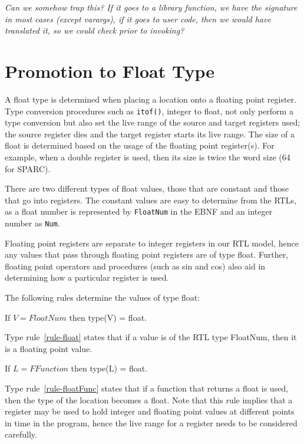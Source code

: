 \emph{Can we somehow trap this?  If it goes to a library function,
we have the signature in most cases (except varargs), if it goes 
to user code, then we would have translated it, so we could check 
prior to invoking?}
 

\section{Promotion to Float Type}
A float type is determined when placing a location onto a 
floating point register.  Type conversion procedures such as 
\texttt{itof()}, integer to float, not only perform a type 
conversion but also set the live range of the source and 
target registers used; the source register dies and the target
register starts its live range.  The size of a float is determined
based on the usage of the floating point register(s).  For 
example, when a double register is used, then its size is twice 
the word size (64 for SPARC). 

There are two different types of float values, those that are 
constant and those that go into registers.  The constant values
are easy to determine from the RTLs, as a float number is 
represented by \texttt{FloatNum} in the EBNF and an integer 
number as \texttt{Num}.  

Floating point registers are separate to integer registers in our
RTL model, hence any values that pass through floating point 
registers are of type float.  Further, floating point operators 
and procedures (such as sin and cos) also aid in determining how a 
particular register is used.  

The following rules determine the values of type float: 

\begin{typerule}
If $V = FloatNum$ then type(V) = float.
\label{rule-float}
\end{typerule}

Type rule~\ref{rule-float} states that if a value is of the 
RTL type FloatNum, then it is a floating point value.

\begin{typerule}
If $L = FFunction$ then type(L) = float.
\label{rule-floatFunc}
\end{typerule}

Type rule~\ref{rule-floatFunc} states that if a function that
returns a float is used, then the type of the location becomes
a float.
Note that this rule implies that a register may be used to 
hold integer and floating point values at different points in 
time in the program, hence the live range for a register needs 
to be considered carefully. 

